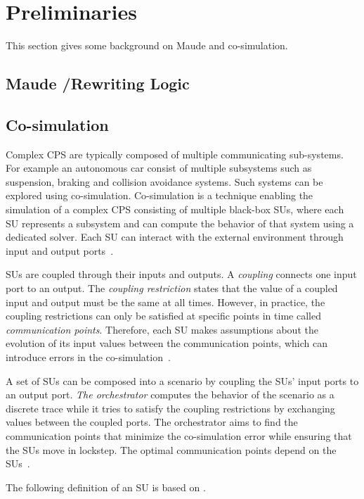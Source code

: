 \section{Preliminaries}\label{sc:background}
This section gives some background on Maude and co-simulation.

\subsection{Maude /Rewriting Logic}

\subsection{Co-simulation}
Complex CPS are typically composed of multiple communicating sub-systems.
For example an autonomous car consist of multiple subsystems such as suspension, braking and collision avoidance systems. 
Such systems can be explored using co-simulation.
Co-simulation is a technique enabling the simulation of a complex CPS consisting of multiple black-box SUs, where each SU represents a subsystem and can compute the behavior of that system using a dedicated solver. 
Each SU can interact with the external environment through input and output ports~\cite{Gomes2019a,Kubler2000}.

SUs are coupled through their inputs and outputs.
A \emph{coupling} connects one input port to an output.
The \emph{coupling restriction} states that the value of a coupled input and output must be the same at all times.
However, in practice, the coupling restrictions can only be satisfied at specific points in time called \emph{communication points}. 
Therefore, each SU makes assumptions about the evolution of its input values between the communication points, which can introduce errors in the co-simulation~\cite{Arnold2014}.

A set of SUs can be composed into a scenario by coupling the SUs' input ports to an output port. 
\emph{The orchestrator} computes the behavior of the scenario as a discrete trace while it tries to satisfy the coupling restrictions by exchanging values between the coupled ports. 
The orchestrator aims to find the communication points that minimize the co-simulation error while ensuring that the SUs move in lockstep. 
The optimal communication points depend on the SUs~\cite{Gomes2019,Oakes2021,Gomes2018f,Schweizer2015c,Gomes2018a}.

The following definition of an SU is based on \cite{Broman2013,Gomes2019c,thrane2021}.

